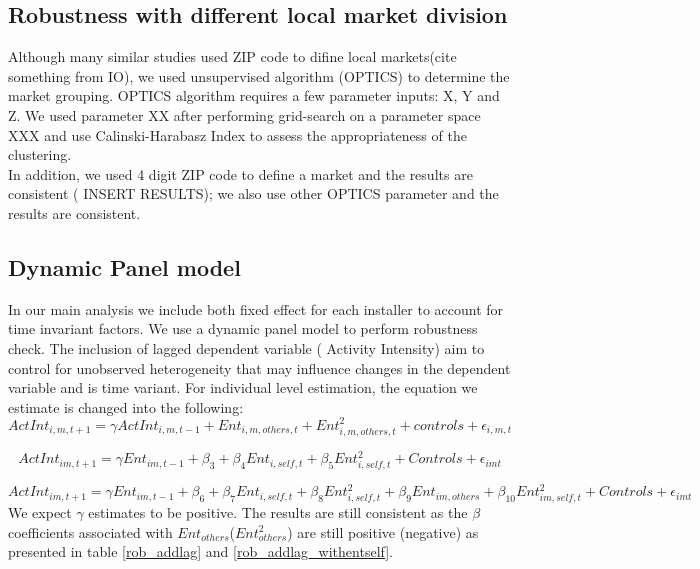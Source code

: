 \documentclass[msom,blindrev]{informs3}
\begin{document}
\subsection{Robustness with different local market division}
Although many similar studies used ZIP code to difine local markets(cite something from IO), we used unsupervised algorithm (OPTICS) to determine the market grouping. OPTICS algorithm requires a few parameter inputs: X, Y and Z. We used parameter XX after performing grid-search on a parameter space XXX and use Calinski-Harabasz Index to assess the appropriateness of the clustering.  \\ In addition, we used 4 digit ZIP code to define a market and the results are consistent ( INSERT RESULTS); we also use other OPTICS parameter and the results are consistent.  \\

\subsection{Dynamic Panel model}
In our main analysis we include both fixed effect for each installer to account for time invariant factors. We use a dynamic panel model to perform robustness check. The inclusion of lagged dependent variable ( Activity Intensity) aim to control for unobserved heterogeneity that may influence changes in the dependent variable and is time variant. For individual level estimation, the equation we estimate is changed into the following:
\begin{equation}
    ActInt_{i,m,t+1}=\gamma ActInt_{i,m,t-1}+Ent_{i,m,others,t}+Ent_{i,m,others,t}^2+
    controls+\epsilon_{i,m,t}
\end{equation}

\begin{equation}
    ActInt_{im,t+1}=\gamma Ent_{im,t-1}+\beta_{3}+\beta_{4} Ent_{i,self,t}+\beta_{5}Ent_{i,self,t}^2+
   Controls+\epsilon_{imt}
   \label{model_ind_dyn_1}
\end{equation}

\begin{equation}
    ActInt_{im,t+1}=\gamma Ent_{im,t-1}+\beta_{6}+\beta_{7} Ent_{i,self,t}+\beta_{8}Ent_{i,self,t}^2+\beta_{9}Ent_{im,others}+\beta_{10}Ent_{im,self,t}^2+
   Controls+\epsilon_{imt}
   \label{model_ind_dyn_2}
\end{equation}
We expect $\gamma$ estimates to be positive. The results are still consistent as the $\beta$ coefficients associated with $Ent_{others}$($Ent_{others}^2$) are still positive (negative) as presented in table \ref{rob_addlag} and \ref{rob_addlag_withentself}.
\end{document}
